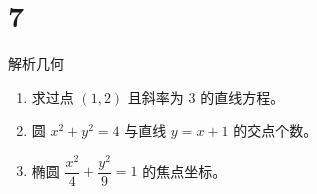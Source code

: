 \chapter{7}{解析几何}

\begin{enumerate}
  \item 求过点 $(1,2)$ 且斜率为 $3$ 的直线方程。
  \item 圆 $x^2+y^2=4$ 与直线 $y=x+1$ 的交点个数。
  \item 椭圆 $\dfrac{x^2}{4}+\dfrac{y^2}{9}=1$ 的焦点坐标。
\end{enumerate}
